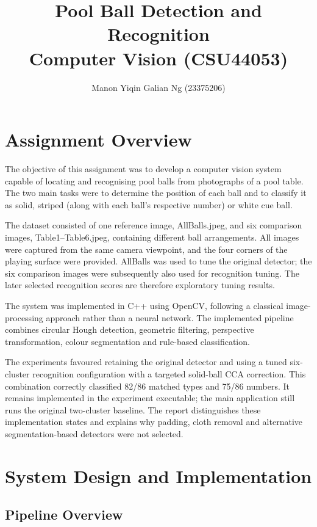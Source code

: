 \documentclass[10pt,a4paper]{article}
\title{Pool Ball Detection and Recognition\\[4pt]
       \large Computer Vision (CSU44053)}
\author{Manon Yiqin Galian Ng (23375206)}
\begin{document}
\maketitle

\section{Assignment Overview}

The objective of this assignment was to develop a computer vision system capable of locating and 
recognising pool balls from photographs of a pool table. The two main tasks were to determine the 
position of each ball and to classify it as solid, striped (along with each ball's respective number)
or white cue ball.

The dataset consisted of one reference image, AllBalls.jpeg, and six comparison
images, Table1--Table6.jpeg, containing different ball arrangements. All images
were captured from the same camera viewpoint, and the four corners of the
playing surface were provided. AllBalls was used to tune the original detector;
the six comparison images were subsequently also used for recognition tuning.
The later selected recognition scores are therefore exploratory tuning results.

The system was implemented in C++ using OpenCV, following a classical image-processing approach 
rather than a neural network. The implemented pipeline combines circular Hough detection,
geometric filtering, perspective transformation, colour segmentation and rule-based classification.

The experiments favoured retaining the original detector and using a tuned
six-cluster recognition configuration with a targeted solid-ball CCA correction.
This combination correctly classified 82/86 matched types and 75/86 numbers.
It remains implemented in the experiment executable; the main application
still runs the original two-cluster baseline. The report distinguishes these
implementation states and explains why padding, cloth removal and alternative
segmentation-based detectors were not selected.

\section{System Design and Implementation}
\subsection{Pipeline Overview}
\end{document}
